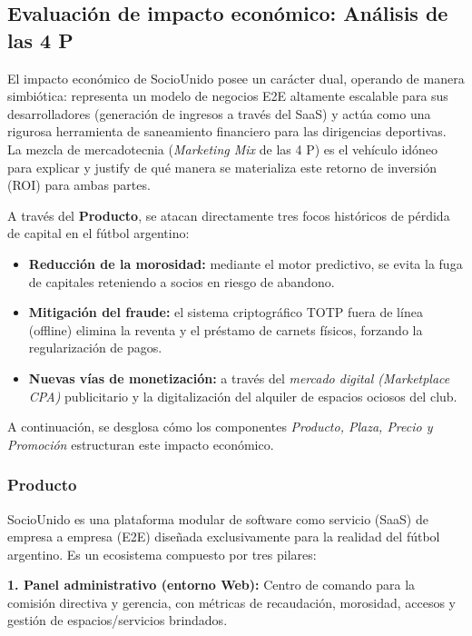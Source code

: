 \newpage

\subsection{Evaluación de impacto económico: Análisis de las 4 P}

El impacto económico de SocioUnido posee un carácter dual, operando de manera simbiótica: representa un modelo de negocios E2E altamente escalable para sus desarrolladores (generación de ingresos a través del SaaS) y actúa como una rigurosa herramienta de saneamiento financiero para las dirigencias deportivas. La mezcla de mercadotecnia (\textit{Marketing Mix} de las 4 P) es el vehículo idóneo para explicar y justify de qué manera se materializa este retorno de inversión (ROI) para ambas partes.

A través del \textbf{Producto}, se atacan directamente tres focos históricos de pérdida de capital en el fútbol argentino:
\begin{itemize}
    \item \textbf{Reducción de la morosidad:} mediante el motor predictivo, se evita la fuga de capitales reteniendo a socios en riesgo de abandono.
    \item \textbf{Mitigación del fraude:} el sistema criptográfico TOTP fuera de línea (offline) elimina la reventa y el préstamo de carnets físicos, forzando la regularización de pagos.
    \item \textbf{Nuevas vías de monetización:} a través del \textit{mercado digital (Marketplace CPA)} publicitario y la digitalización del alquiler de espacios ociosos del club.
\end{itemize}

A continuación, se desglosa cómo los componentes \textit{Producto, Plaza, Precio y Promoción} estructuran este impacto económico.

\subsubsection*{Producto}

SocioUnido es una plataforma modular de software como servicio (SaaS) de empresa a empresa (E2E) diseñada exclusivamente para la realidad del fútbol argentino. Es un ecosistema compuesto por tres pilares:

\textbf{1. Panel administrativo (entorno Web):} Centro de comando para la comisión directiva y gerencia, con métricas de recaudación, morosidad, accesos y gestión de espacios/servicios brindados.

